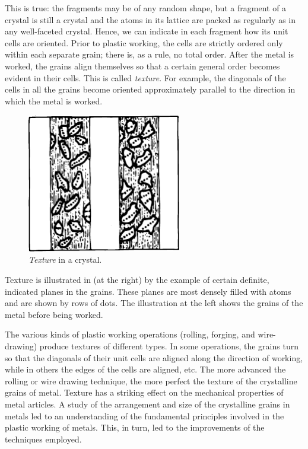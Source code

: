 This is true: the fragments may be of any random shape, but a fragment of a crystal is still a crystal and the atoms in its lattice are packed as regularly as in any well-faceted crystal. Hence, we can indicate in each fragment how its unit cells are oriented. Prior to plastic working, the cells are strictly ordered only within each separate grain; there is, as a rule, no total order. After the metal is worked, the grains align themselves so that a certain general order becomes evident in their cells. This is called \emph{texture}. For example, the diagonals of the cells in all the grains become oriented approximately parallel to the direction in which the metal is worked.

\begin{figure}[!ht]
\centering
\includegraphics[width=0.6\textwidth]{figures/fig-02-23.pdf}
\caption{\emph{Texture} in a crystal.}
\label{fig-2.23}
\end{figure}

Texture is illustrated in  (at the right) by the example of certain definite, indicated planes in the grains. These planes are most densely filled with atoms and are shown by rows of dots. The illustration at the left shows the grains of the metal before being worked.

The various kinds of plastic working operations (roll­ing, forging, and wire-drawing) produce textures of different types. In some operations, the grains turn so that the diagonals of their unit cells are aligned along the direc­tion of working, while in others the edges of the cells are aligned, etc. The more advanced the rolling or wire­ drawing technique, the more perfect the texture of the crystalline grains of metal. Texture has a striking effect on the mechanical properties of metal articles. A study of the arrangement and size of the crystalline grains in metals led to an understanding of the fundamental prin­ciples involved in the plastic working of metals. This, in turn, led to the improvements of the techniques em­ployed.

